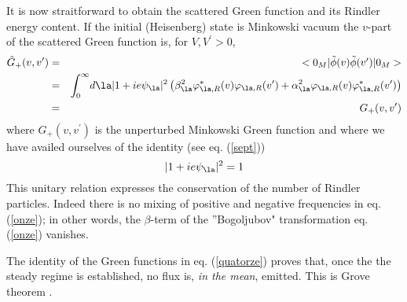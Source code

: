 It is now straitforward to obtain the  scattered Green function and its
Rindler energy content. If the initial (Heisenberg) state is Minkowski vacuum
the $v$-part of the scattered Green function is, for $V,V^\prime > 0$,
\begin{eqnarray}
\tilde G_+(v,v^\prime) &=& \expect{0_M}{\tilde  \phi(v)
 \tilde \phi(v^\prime)}{0_M}\nonumber\\ &=&  \int_0^{\infty}\! d\la
 |1+ ie\psi _{ \la}|^2 \left(
\beta_{\la}^2
 \varphi_{\la,R}^*(v)  \varphi_{\la,R}(v^\prime) +
\alpha_{\la}^2
 \varphi_{\la,R}(v)  \varphi_{\la,R}^*(v^\prime) \right)
\nonumber\\
&=& G_+(v,v^\prime)
\label{quatorze}
\end{eqnarray}
where $G_+(v,v^\prime)$ is the unperturbed Minkowski Green function and
where we have availed ourselves of the identity (see eq. (\ref{sept}))
\begin{equation}
|1+ ie\psi _{ \la}|^2 = 1
\label{quinze}
\end{equation}
This unitary
relation
expresses the conservation of the number of Rindler
particles.
Indeed there is no mixing of positive and negative frequencies in
eq. (\ref{onze}); in other words, the $ \beta$-term of the ''Bogoljubov"
transformation eq. (\ref{onze})
vanishes.

The identity of the Green functions in eq. (\ref{quatorze}) proves that, once
the the steady regime is established,
no flux
is, {\it
 in the
mean},
emitted.
This is
Grove theorem \cite{Grove} \cite{RSG}.

